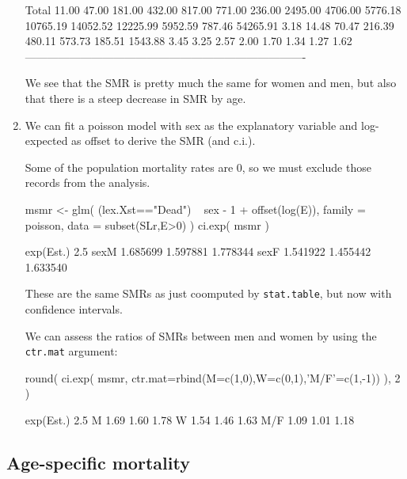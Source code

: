 \begin{enumerate}[resume]
\begin{Schunk}
\begin{Soutput}
                                                                              
 Total     11.00   47.00   181.00   432.00   817.00  771.00  236.00  2495.00  
         4706.00 5776.18 10765.19 14052.52 12225.99 5952.59  787.46 54265.91  
            3.18   14.48    70.47   216.39   480.11  573.73  185.51  1543.88  
            3.45    3.25     2.57     2.00     1.70    1.34    1.27     1.62  
 ---------------------------------------------------------------------------- 
\end{Soutput}
\end{Schunk}
  We see that the SMR is pretty much the same for women and men, but
  also that there is a steep decrease in SMR by age. 



\item We can fit a poisson model with sex as the explanatory variable and
  log-expected as offset to derive the SMR (and c.i.).

  Some of the population mortality rates are 0, so we must exclude
  those records from the analysis.
\begin{Schunk}
\begin{Sinput}
 msmr <- glm( (lex.Xst=="Dead") ~ sex - 1 + offset(log(E)),
              family = poisson,
              data = subset(SLr,E>0) )
 ci.exp( msmr )
\end{Sinput}
\begin{Soutput}
     exp(Est.)     2.5%    97.5%
sexM  1.685699 1.597881 1.778344
sexF  1.541922 1.455442 1.633540
\end{Soutput}
\end{Schunk}
  These are the same SMRs as just coomputed by \texttt{stat.table},
  but now with confidence intervals.
  
  We can assess the ratios of SMRs between men and women by using the
  \texttt{ctr.mat} argument:
\begin{Schunk}
\begin{Sinput}
 round( ci.exp( msmr, ctr.mat=rbind(M=c(1,0),W=c(0,1),'M/F'=c(1,-1)) ), 2 )
\end{Sinput}
\begin{Soutput}
    exp(Est.) 2.5% 97.5%
M        1.69 1.60  1.78
W        1.54 1.46  1.63
M/F      1.09 1.01  1.18
\end{Soutput}
\end{Schunk}

\end{enumerate}

\subsection*{Age-specific mortality}
 
